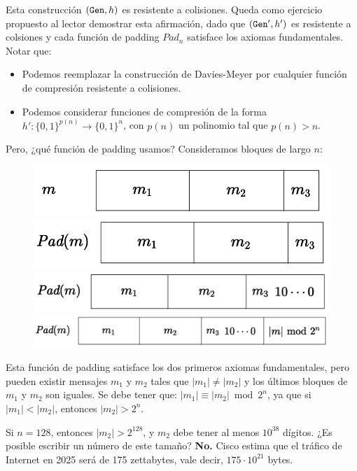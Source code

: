 Esta construcción $(\texttt{Gen}, h)$ es resistente a colisiones. Queda como ejercicio propuesto al lector demostrar esta afirmación, dado que $(\texttt{Gen}', h')$ es resistente a colsiones y cada función de padding $Pad_n$ satisface los axiomas fundamentales. Notar que:
\begin{itemize}
    \item Podemos reemplazar la construcción de Davies-Meyer por cualquier función de compresión resistente a colisiones.
    \item Podemos considerar funciones de compresión de la forma $h':\{0,1\}^{p(n)} \to \{0,1\}^n$, con $p(n)$ un polinomio tal que $p(n) > n$.
\end{itemize}

Pero, ¿qué función de padding usamos? Consideramos bloques de largo $n$:
\begin{figure}[H]
    \centering
    \includegraphics[scale=0.35]{img/cap5/6.png}
    \hspace{1.51cm}
    \includegraphics[scale=0.35]{img/cap5/7.png}
    \includegraphics[scale=0.35]{img/cap5/8.png}
    \includegraphics[scale=0.35]{img/cap5/9.png}
\end{figure}

Esta función de padding satisface los dos primeros axiomas fundamentales, pero pueden existir mensajes $m_1$ y $m_2$ tales que $|m_1| \neq |m_2|$ y los últimos bloques de $m_1$ y $m_2$ son iguales. Se debe tener que: $|m_1| \equiv |m_2| \bmod 2^n$, ya que si $|m_1| < |m_2|$, entonces $|m_2| > 2^n$. \medbreak

Si $n = 128$, entonces $|m_2| > 2^{128}$, y $m_2$ debe tener al menos $10^{38}$ dígitos. ¿Es posible escribir un número de este tamaño? \textbf{No.} Cisco estima que el tráfico de Internet en 2025 será de 175 zettabytes, vale decir, $175 \cdot 10^{21}$ bytes.

